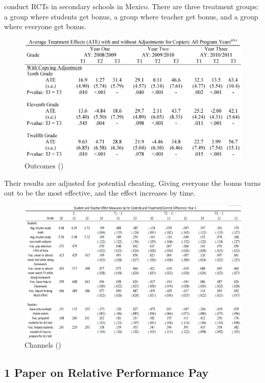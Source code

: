         \subsubsection{\cite{behrman_aligning_2015}}

            \cite{behrman_aligning_2015} conduct RCTs in secondary schools in Mexico. There are three treatment groups: a group where students get bonus, a group where teacher get bonus, and a group where everyone get bonus.
            \begin{figure}[H]
                \centering
                \includegraphics[width=4.5in]{images/ch10/10 berhman 1.png}
                \caption{Outcomes (\cite{behrman_aligning_2015})}
            \end{figure}
            Their results are adjusted for potential cheating. Giving everyone the bonus turns out to be the most effective, and the effect increases by time.
            \begin{figure}[H]
                \centering
                \includegraphics[width=4.5in]{images/ch10/10 berhman 2.png}
                \caption{Channels (\cite{behrman_aligning_2015})}
            \end{figure}

    \subsection{1 Paper on Relative Performance Pay}

